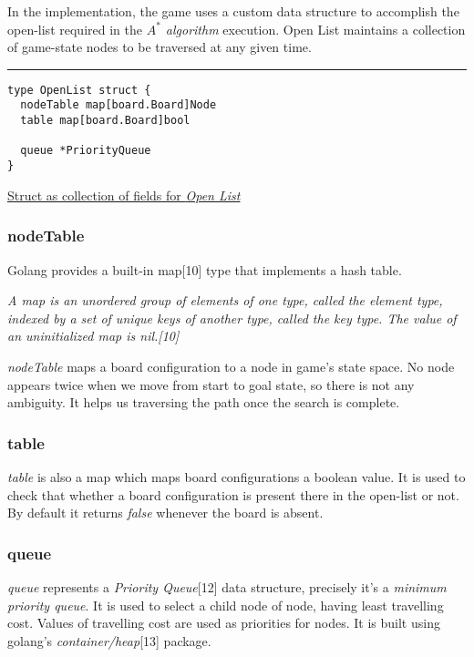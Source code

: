 \documentclass[a4paper]{article}
\begin{document}
\textrm{\normalsize{In the implementation, the game uses a custom data structure to accomplish the open-list required
in the \textit{$A^{*}$ algorithm} execution. Open List maintains a collection of game-state nodes to be
traversed at any given time.\\}}

\rule{\textwidth}{1pt}
\begin{verbatim}
type OpenList struct {
  nodeTable map[board.Board]Node
  table map[board.Board]bool

  queue *PriorityQueue
}
\end{verbatim}
\underline{Struct as collection of fields for \textit{Open List}}

\subsubsection{nodeTable}

\textrm{\normalsize{Golang provides a built-in map[10] type that implements a hash table.\\}}

\textrm{\normalsize{\textit{A map is an unordered group of elements of one type, called the element type, indexed by a set of
unique keys of another type, called the key type. The value of an uninitialized map is nil.[10]\\}}}

\textrm{\normalsize{\textit{nodeTable} maps a board configuration to a node in game's state space. No node appears twice
when we move from start to goal state, so there is not any ambiguity. It helps us traversing the path
once the search is complete.}}

\subsubsection{table}

\textrm{\normalsize{\textit{table}  is also a map which maps board configurations a boolean value. It is used to check that
whether a board configuration is present there in the open-list or not. By default it returns \textit{false}
whenever the board is absent.\\}}

\subsubsection{queue}

\textrm{\normalsize{\textit{queue} represents a \textit{Priority Queue}[12] data structure, precisely it's a \textit{minimum priority queue}. It is used
to select a child node of node, having least travelling cost. Values of travelling cost are used as
priorities for nodes. It is built using golang's \textit{container/heap}[13] package.\\}}
\end{document}
